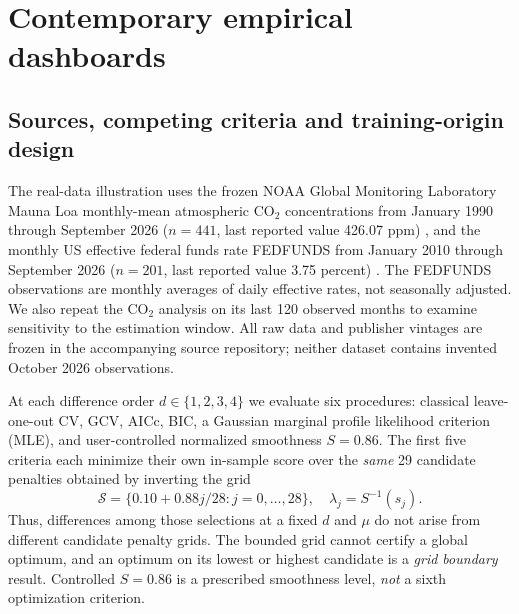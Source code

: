 \section{Contemporary empirical dashboards}\label{sec:dashboards}

\subsection{Sources, competing criteria and training-origin design}
The real-data illustration uses the frozen NOAA Global Monitoring
Laboratory Mauna Loa monthly-mean atmospheric CO$_2$ concentrations
from January 1990 through September 2026 ($n=441$, last reported
value 426.07 ppm) \cite{noaa2026mlo}, and the monthly US
effective federal funds rate FEDFUNDS from January 2010 through
September 2026 ($n=201$, last reported value 3.75 percent)
\cite{fred2026fedfunds}. The FEDFUNDS observations are monthly
averages of daily effective rates, not seasonally adjusted. We
also repeat the CO$_2$ analysis on its last 120 observed months
to examine sensitivity to the estimation window. All raw data
and publisher vintages are frozen in the accompanying source
repository; neither dataset contains invented October 2026
observations.

At each difference order $d\in\{1,2,3,4\}$ we evaluate six
procedures: classical leave-one-out CV, GCV, AICc, BIC, a
Gaussian marginal profile likelihood criterion (MLE), and
user-controlled normalized smoothness $S=0.86$. The first five
criteria each minimize their own in-sample score over the
\emph{same} 29 candidate penalties obtained by inverting
the grid
\[
  \mathcal S=\{0.10+0.88j/28:j=0,\ldots,28\},\quad
  \lambda_j=S^{-1}(s_j).
\]
Thus, differences among those selections at a fixed $d$ and
$\mu$ do not arise from different candidate penalty grids.
The bounded grid cannot certify a global optimum, and an
optimum on its lowest or highest candidate is a \emph{grid
boundary} result. Controlled $S=0.86$ is a prescribed
smoothness level, \emph{not} a sixth optimization criterion.

